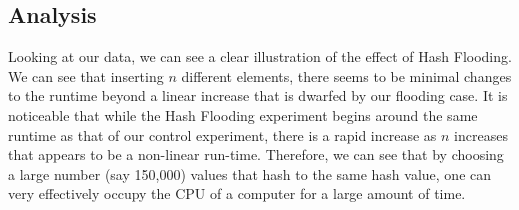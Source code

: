\documentclass[11pt]{article}
\begin{document}
\subsection*{Analysis}
\vspace{-2mm}
Looking at our data, we can see a clear illustration of the effect of Hash Flooding. We can see that inserting $n$ different elements, there seems to be minimal changes to the runtime beyond a 
linear increase that is dwarfed by our flooding case. It is noticeable that while the Hash Flooding experiment begins around the same runtime as that of our control experiment, there is a rapid increase 
as $n$ increases that appears to be a non-linear run-time. Therefore, we can see that by choosing a large number (say 150,000) values that hash to the same hash value,
one can very effectively occupy the CPU of a computer for a large amount of time.
\end{document}
